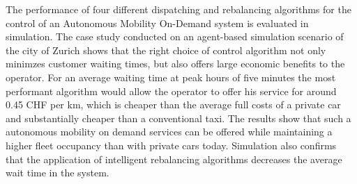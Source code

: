 The performance of four different dispatching and rebalancing algorithms for the
control of an Autonomous Mobility On-Demand system is evaluated in simulation.
The case study conducted on an agent-based simulation scenario of the city of Zurich
shows that the right choice of control algorithm not only minimzes customer waiting
times, but also offers large economic benefits to the operator. For an average
waiting time at peak hours of five minutes the most performant algorithm would allow
the operator to offer his service for around 0.45 CHF per km, which is cheaper than
the average full costs of a private car and substantially cheaper than a conventional
taxi. The results show that such a autonomous mobility on demand services can be offered
while maintaining a higher fleet occupancy than with private cars today. Simulation
also confirms that the application of intelligent rebalancing algorithms decreases
the average wait time in the system.
